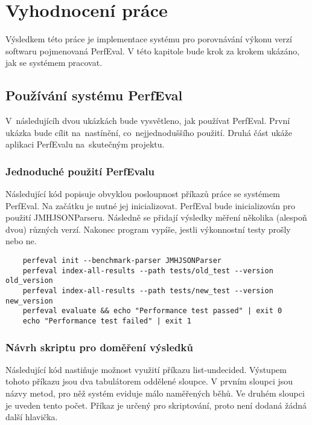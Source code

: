 \chapter{Vyhodnocení práce}

Výsledkem této práce je implementace systému pro porovnávání výkonu verzí softwaru
pojmenovaná PerfEval. V této kapitole bude krok za krokem ukázáno, jak se systémem pracovat.

\section{Používání systému PerfEval}

V~následujícíh dvou ukázkách bude vysvětleno, jak používat PerfEval. První ukázka bude
cílit na~nastínění, co~nejjednoduššího použití. Druhá část ukáže aplikaci PerfEvalu na~skutečným projektu.

\subsection*{Jednoduché použití PerfEvalu}

Následující kód popisuje obvyklou posloupnost příkazů práce se systémem PerfEval.
Na začátku je nutné jej inicializovat. PerfEval bude inicializován pro použití JMHJSONParseru.
Následně se přidají výsledky měření několika (alespoň dvou) různých verzí.
Nakonec program vypíše, jestli výkonnostní testy prošly nebo ne.

\begin{lstlisting}
    perfeval init --benchmark-parser JMHJSONParser
    perfeval index-all-results --path tests/old_test --version old_version
    perfeval index-all-results --path tests/new_test --version new_version
    perfeval evaluate && echo "Performance test passed" | exit 0
    echo "Performance test failed" | exit 1
\end{lstlisting}

\subsection*{Návrh skriptu pro doměření výsledků}

Následující kód nastiňuje možnost využití příkazu list-undecided. Výstupem tohoto příkazu
jsou dva tabulátorem oddělené sloupce. V prvním sloupci jsou názvy metod, pro něž systém
eviduje málo naměřených běhů. Ve druhém sloupci je uveden tento počet. Příkaz je určený
pro skriptování, proto není dodaná žádná další hlavička.

